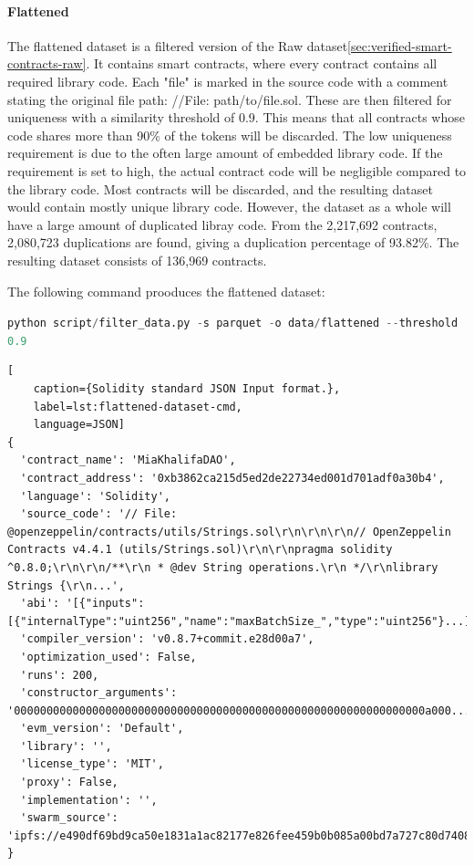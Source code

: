 \paragraph{Flattened}
\label{sec:verified-smart-contracts-flattened}

The flattened dataset is a filtered version  of the Raw dataset\cref{sec:verified-smart-contracts-raw}. It contains smart contracts, where every contract contains all required library code. Each "file" is marked in the source code with a comment stating the original file path: //File: path/to/file.sol. These are then filtered for uniqueness with a similarity threshold of 0.9. This means that all contracts whose code shares more than 90\% of the tokens will be discarded. The low uniqueness requirement is due to the often large amount of embedded library code. If the requirement is set to high, the actual contract code will be negligible compared to the library code. Most contracts will be discarded, and the resulting dataset would contain mostly unique library code. However, the dataset as a whole will have a large amount of duplicated libray code. From the 2,217,692 contracts, 2,080,723 duplications are found, giving a duplication percentage of 93.82\%. The resulting dataset consists of 136,969 contracts.


The following command prooduces the flattened dataset:

\lstinline[language=Python]!python script/filter_data.py -s parquet -o data/flattened --threshold 0.9!


\begin{lstlisting}[
    caption={Solidity standard JSON Input format.},
    label=lst:flattened-dataset-cmd,
    language=JSON]
{
  'contract_name': 'MiaKhalifaDAO',
  'contract_address': '0xb3862ca215d5ed2de22734ed001d701adf0a30b4',
  'language': 'Solidity',
  'source_code': '// File: @openzeppelin/contracts/utils/Strings.sol\r\n\r\n\r\n// OpenZeppelin Contracts v4.4.1 (utils/Strings.sol)\r\n\r\npragma solidity ^0.8.0;\r\n\r\n/**\r\n * @dev String operations.\r\n */\r\nlibrary Strings {\r\n...',
  'abi': '[{"inputs":[{"internalType":"uint256","name":"maxBatchSize_","type":"uint256"}...]',
  'compiler_version': 'v0.8.7+commit.e28d00a7',
  'optimization_used': False,
  'runs': 200,
  'constructor_arguments': '000000000000000000000000000000000000000000000000000000000000000a000...',
  'evm_version': 'Default',
  'library': '',
  'license_type': 'MIT',
  'proxy': False,
  'implementation': '',
  'swarm_source': 'ipfs://e490df69bd9ca50e1831a1ac82177e826fee459b0b085a00bd7a727c80d74089'
}
\end{lstlisting}

